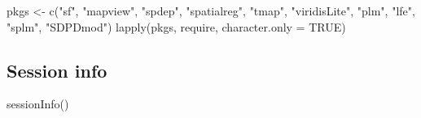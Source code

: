 \documentclass[
  letterpaper,
]{scrbook}
\newenvironment{Shaded}{\begin{snugshade}}{\end{snugshade}}
\newcommand{\AttributeTok}[1]{\textcolor[rgb]{0.40,0.45,0.13}{#1}}
\newcommand{\ConstantTok}[1]{\textcolor[rgb]{0.56,0.35,0.01}{#1}}
\newcommand{\FunctionTok}[1]{\textcolor[rgb]{0.28,0.35,0.67}{#1}}
\newcommand{\NormalTok}[1]{\textcolor[rgb]{0.00,0.23,0.31}{#1}}
\newcommand{\OtherTok}[1]{\textcolor[rgb]{0.00,0.23,0.31}{#1}}
\newcommand{\StringTok}[1]{\textcolor[rgb]{0.13,0.47,0.30}{#1}}
\begin{document}
\begin{Shaded}
\begin{Highlighting}[]
\NormalTok{pkgs }\OtherTok{\textless{}{-}} \FunctionTok{c}\NormalTok{(}\StringTok{"sf"}\NormalTok{, }\StringTok{"mapview"}\NormalTok{, }\StringTok{"spdep"}\NormalTok{, }\StringTok{"spatialreg"}\NormalTok{, }\StringTok{"tmap"}\NormalTok{, }\StringTok{"viridisLite"}\NormalTok{, }
          \StringTok{"plm"}\NormalTok{, }\StringTok{"lfe"}\NormalTok{, }\StringTok{"splm"}\NormalTok{, }\StringTok{"SDPDmod"}\NormalTok{)}
\FunctionTok{lapply}\NormalTok{(pkgs, require, }\AttributeTok{character.only =} \ConstantTok{TRUE}\NormalTok{)}
\end{Highlighting}
\end{Shaded}

\hypertarget{session-info-10}{%
\subsection*{Session info}\label{session-info-10}}

\begin{Shaded}
\begin{Highlighting}[]
\FunctionTok{sessionInfo}\NormalTok{()}
\end{Highlighting}
\end{Shaded}
\end{document}
